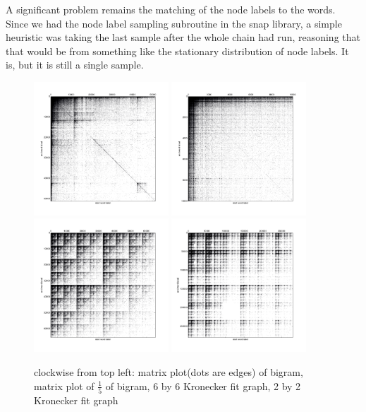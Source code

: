 \documentclass[12pt]{article}
\begin{document}
A significant problem remains the matching of the node labels to the words. Since we had the node label sampling subroutine in the snap library, a simple heuristic was taking the last sample after the whole chain had run, reasoning that that would be from something like the stationary distribution of node labels. It is, but it is still a single sample.
\begin{figure}
  \includegraphics[width=0.45\textwidth]{bigram_sparsematplot.png}
  \includegraphics[width=0.45\textwidth]{bigram_small_sparsematplot.png}
  \includegraphics[width=0.45\textwidth]{kronfit2_sparsematplot.png}
  \includegraphics[width=0.45\textwidth]{kronfit6_sparsematplot.png}
  \caption{clockwise from top left: matrix plot(dots are edges) of bigram, matrix plot of $\frac{1}{5}$ of bigram, 6 by 6 Kronecker fit graph, 2 by 2 Kronecker fit graph}
\end{figure}
\end{document}
